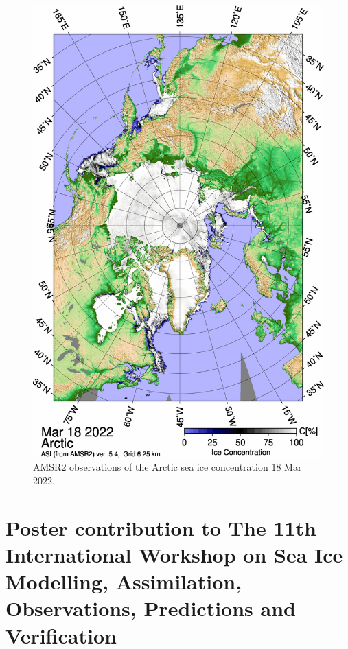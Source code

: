 \documentclass[../main/thesis.tex]{subfiles}
\begin{document}
\begin{figure}
    \centering
    \includegraphics[width=.8\textwidth]{amsr218.png}
    \caption{\label{fig:S-amsr2-18}AMSR2 observations of the Arctic sea ice concentration 18 Mar 2022.}
\end{figure}

\newpage

\section{Poster contribution to The 11th International Workshop on Sea Ice Modelling, Assimilation, Observations, Predictions and Verification}


\end{document}
